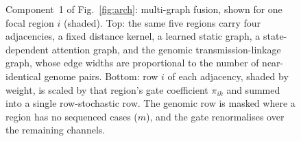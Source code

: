 \begin{figure}[t]
{%
}
\caption{Component~1 of Fig.~\ref{fig:arch}: multi-graph fusion, shown for one focal region $i$ (shaded). Top: the same five regions carry four adjacencies, a fixed distance kernel, a learned static graph, a state-dependent attention graph, and the genomic transmission-linkage graph, whose edge widths are proportional to the number of near-identical genome pairs. Bottom: row $i$ of each adjacency, shaded by weight, is scaled by that region's gate coefficient $\pi_{ik}$ and summed into a single row-stochastic row. The genomic row is masked where a region has no sequenced cases ($m$), and the gate renormalises over the remaining channels.}
\label{fig:fusion}
\end{figure}
